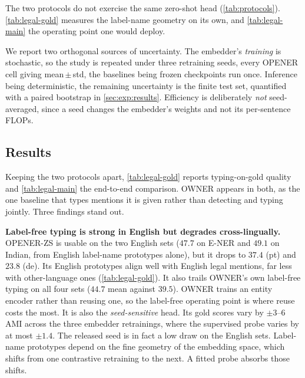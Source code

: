 The two protocols do not exercise the same zero-shot head (\autoref{tab:protocols}). \autoref{tab:legal-gold} measures the label-name geometry on its own, and \autoref{tab:legal-main} the operating point one would deploy.

We report two orthogonal sources of uncertainty. The embedder's \emph{training} is stochastic, so the study is repeated under three retraining seeds, every OPENER cell giving mean\,$\pm$\,std, the baselines being frozen checkpoints run once. Inference being deterministic, the remaining uncertainty is the finite test set, quantified with a paired bootstrap in \autoref{sec:exp:results}. Efficiency is deliberately \emph{not} seed-averaged, since a seed changes the embedder's weights and not its per-sentence FLOPs.

\subsection{Results}
\label{sec:exp:results}
Keeping the two protocols apart, \autoref{tab:legal-gold} reports typing-on-gold quality and \autoref{tab:legal-main} the end-to-end comparison. OWNER appears in both, as the one baseline that types mentions it is given rather than detecting and typing jointly. Three findings stand out.

\textbf{Label-free typing is strong in English but degrades cross-lingually.} OPENER-ZS is usable on the two English sets ($47.7$ on E-NER and $49.1$ on Indian, from English label-name prototypes alone), but it drops to $37.4$ (pt) and $23.8$ (de). Its English prototypes align well with English legal mentions, far less with other-language ones (\autoref{tab:legal-gold}). It also trails OWNER's own label-free typing on all four sets ($44.7$ mean against $39.5$). OWNER trains an entity encoder rather than reusing one, so the label-free operating point is where reuse costs the most. It is also the \emph{seed-sensitive} head. Its gold scores vary by ${\pm}3$--$6$ AMI across the three embedder retrainings, where the supervised probe varies by at most ${\pm}1.4$. The released seed is in fact a low draw on the English sets. Label-name prototypes depend on the fine geometry of the embedding space, which shifts from one contrastive retraining to the next. A fitted probe absorbs those shifts.

